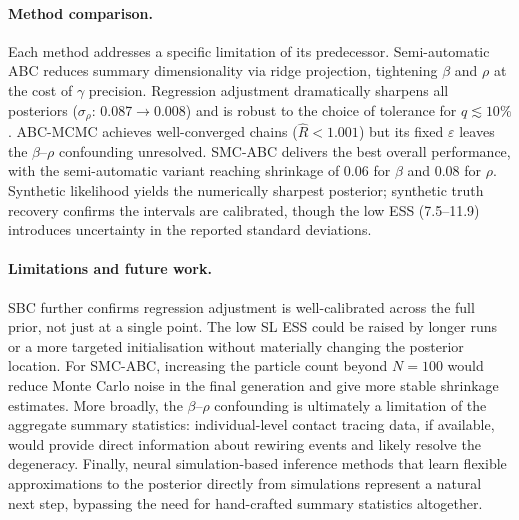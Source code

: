 \documentclass[11pt, a4paper]{article}
\begin{document}
\paragraph{Method comparison.}
Each method addresses a specific limitation of its predecessor.
Semi-automatic ABC reduces summary dimensionality via ridge projection, tightening
$\beta$ and $\rho$ at the cost of $\gamma$ precision.
Regression adjustment \citep{beaumont2002} dramatically sharpens all posteriors
($\sigma_\rho$: 0.087$\to$0.008) and is robust to the choice of tolerance for $q\lesssim10\%$.
ABC-MCMC \citep{marjoram2003} achieves well-converged chains ($\hat{R}<1.001$) but its fixed
$\varepsilon$ leaves the $\beta$--$\rho$ confounding unresolved.
SMC-ABC \citep{sisson2007} delivers the best overall performance, with the semi-automatic
variant reaching shrinkage of 0.06 for $\beta$ and 0.08 for $\rho$.
Synthetic likelihood \citep{wood2010} yields the numerically sharpest posterior; synthetic
truth recovery confirms the intervals are calibrated, though the low ESS (7.5--11.9) introduces
uncertainty in the reported standard deviations.

\paragraph{Limitations and future work.}
SBC further confirms regression adjustment is well-calibrated across the full prior,
not just at a single point.
The low SL ESS could be raised by longer runs or a more targeted initialisation
without materially changing the posterior location.
For SMC-ABC, increasing the particle count beyond $N=100$ would reduce Monte
Carlo noise in the final generation and give more stable shrinkage estimates.
More broadly, the $\beta$--$\rho$ confounding is ultimately a limitation of
the aggregate summary statistics: individual-level contact tracing data, if
available, would provide direct information about rewiring events and likely
resolve the degeneracy.
Finally, neural simulation-based inference methods \citep[e.g.][]{cranmer2020}
that learn flexible approximations to the posterior directly from simulations
represent a natural next step, bypassing the need for hand-crafted summary
statistics altogether.



\end{document}
